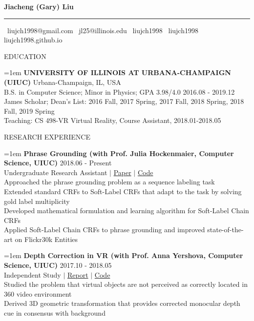 \documentclass[10pt]{article}
\begin{document}
\begin{center}
    \textbf{\LARGE Jiacheng (Gary) Liu}
    \hrule
    \faEnvelope \, liujch1998@gmail.com \quad
    \faEnvelope \, jl25@illinois.edu \quad
    \faLinkedin \, liujch1998 \quad
    \faGithub \, liujch1998 \quad
    \faGithubAlt \, liujch1998.github.io
\end{center}

\vspace{1em}
{\LARGE EDUCATION}

\hangindent=1em
\textbf{UNIVERSITY OF ILLINOIS AT URBANA-CHAMPAIGN (UIUC)} \hfill Urbana-Champaign, IL, USA \\
B.S. in Computer Science; Minor in Physics; GPA 3.98/4.0 \hfill 2016.08 - 2019.12 \\
James Scholar; Dean's List: 2016 Fall, 2017 Spring, 2017 Fall, 2018 Spring, 2018 Fall, 2019 Spring \\
Teaching: CS 498-VR Virtual Reality, Course Assistant, 2018.01-2018.05

\vspace{1em}
{\LARGE RESEARCH EXPERIENCE}

\hangindent=1em
\textbf{Phrase Grounding (with Prof. Julia Hockenmaier, Computer Science, UIUC)} \hfill 2018.06 - Present \\
Undergraduate Research Assistant $|$ \href{https://arxiv.org/abs/1909.00301}{Paper} $|$ \href{https://github.com/liujch1998/SoftLabelCCRF}{Code} \\
Approached the phrase grounding problem as a sequence labeling task \\
Extended standard CRFs to Soft-Label CRFs that adapt to the task by solving gold label multiplicity \\
Developed mathematical formulation and learning algorithm for Soft-Label Chain CRFs \\
Applied Soft-Label Chain CRFs to phrase grounding and improved state-of-the-art on Flickr30k Entities

\hangindent=1em
\textbf{Depth Correction in VR (with Prof. Anna Yershova, Computer Science, UIUC)} \hfill 2017.10 - 2018.05 \\
Independent Study $|$ \href{https://github.com/liujch1998/Lab/blob/master/vr-360-depth-correction/report/report.pdf}{Report} $|$ \href{https://github.com/liujch1998/Lab/tree/master/vr-360-depth-correction}{Code} \\
Studied the problem that virtual objects are not perceived as correctly located in 360 video environment \\
Derived 3D geometric transformation that provides corrected monocular depth cue in consensus with background
\end{document}
